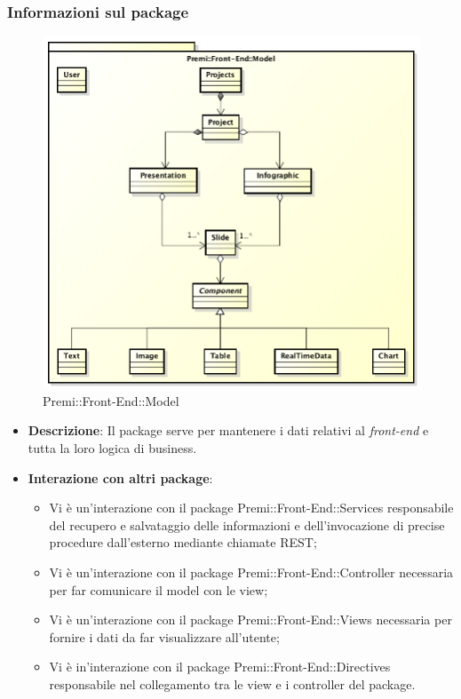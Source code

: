 \subsubsection*{Informazioni sul package}
\begin{figure}[h]
	\centering
	\includegraphics[width=0.9\linewidth]{img/front-end_model}
	\caption[Premi::Front-End::Model]{Premi::Front-End::Model}
\end{figure}
\begin{itemize}
	\item \textbf{Descrizione}: Il package serve per mantenere i dati relativi al \textit{\gls{front-end}} e tutta la loro logica di \gls{business}.
	\item \textbf{Interazione con altri package}:
	\begin{itemize}
		\item Vi è un'interazione con il package Premi::Front-End::Services responsabile del recupero e salvataggio delle informazioni e dell'invocazione di precise procedure dall'esterno mediante chiamate REST;
		\item Vi è un'interazione con il package Premi::Front-End::Controller necessaria per far comunicare il model con le view;
		\item Vi è un'interazione con il package Premi::Front-End::Views necessaria per fornire i dati da far visualizzare all'utente;
		\item Vi è in'interazione con il package Premi::Front-End::Directives responsabile nel collegamento tra le view e i controller del package.
	\end{itemize}
\end{itemize}

